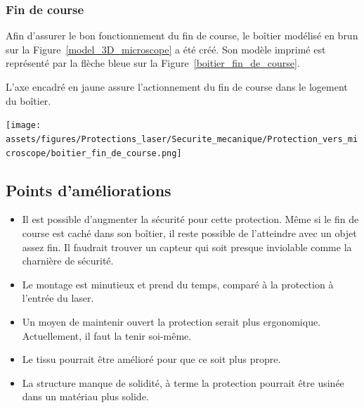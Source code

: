 \subsubsection{Fin de course}
\begin{minipage}[c]{0.48\textwidth}
    Afin d'assurer le bon fonctionnement du fin de course, le boîtier modélisé en \textcolor[RGB]{120, 70, 30}{brun} sur la Figure~\ref{model_3D_microscope} a été créé. Son modèle imprimé est représenté par la flèche \textcolor[RGB]{115, 210, 210}{bleue} sur la Figure~\ref{boitier_fin_de_course}.

    \vspace{1em}
    L'axe encadré en \textcolor[RGB]{233, 173, 56}{jaune} assure l'actionnement du fin de course dans le logement du boîtier.

\end{minipage}\hfill
\begin{minipage}[c]{0.48\textwidth}
    \begin{center}
        \texttt{[image: assets/figures/Protections\_laser/Securite\_mecanique/Protection\_vers\_microscope/boitier\_fin\_de\_course.png]}
    \end{center}
    \label{boitier_fin_de_course}
\end{minipage}

\subsection{Points d'améliorations}
\begin{itemize}[label=\textbullet]
    \item Il est possible d'augmenter la sécurité pour cette protection. Même si le fin de course est caché dans son boîtier, il reste possible de l'atteindre avec un objet assez fin. Il faudrait trouver un capteur qui soit presque inviolable comme la charnière de sécurité.
    \item Le montage est minutieux et prend du temps, comparé à la protection à l'entrée du laser.
    \item Un moyen de maintenir ouvert la protection serait plus ergonomique. Actuellement, il faut la tenir soi-même.
    \item Le tissu pourrait être amélioré pour que ce soit plus propre.
    \item La structure manque de solidité, à terme la protection pourrait être usinée dans un matériau plus solide.
\end{itemize}
